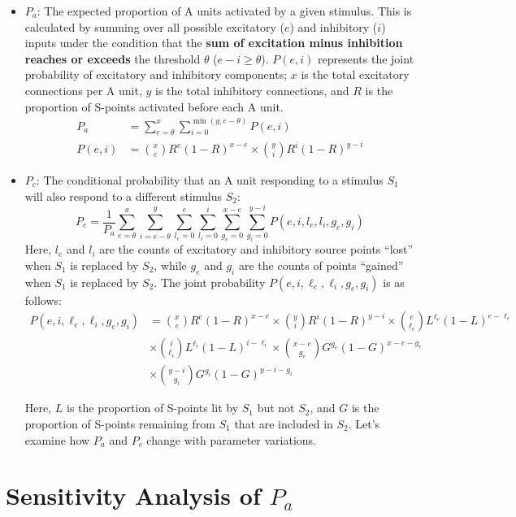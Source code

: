 \documentclass[11p,oneside]{book}
\begin{document}
\begin{itemize}
    \item \textbf{$P_a$}: The expected proportion of A units activated by a given stimulus. This is calculated by summing over all possible excitatory ($e$) and inhibitory ($i$) inputs under the condition that the \textbf{sum of excitation minus inhibition reaches or exceeds} the threshold $\theta$ ($e - i \geq \theta$). $P(e, i)$ represents the joint probability of excitatory and inhibitory components; $x$ is the total excitatory connections per A unit, $y$ is the total inhibitory connections, and $R$ is the proportion of S-points activated before each A unit.
    \begin{align*}
    P_a &= \sum_{e=\theta}^x \sum_{i=0}^{\min(y, e-\theta)} P(e, i) \\
    P(e, i) &= \binom{x}{e} R^e (1 - R)^{x - e} \times \binom{y}{i} R^i (1 - R)^{y - i}
\end{align*}
    \item \textbf{$P_c$}: The conditional probability that an A unit responding to a stimulus $S_1$ will also respond to a different stimulus $S_2$:
    \[
    P_c = \frac{1}{P_a} \sum_{e=\theta}^x \sum_{i=e-\theta}^y \sum_{l_e=0}^e \sum_{l_i=0}^i \sum_{g_e=0}^{x-e} \sum_{g_i=0}^{y-i} P(e, i, l_e, l_i, g_e, g_i)
    \]
    Here, $l_e$ and $l_i$ are the counts of excitatory and inhibitory source points “lost” when $S_1$ is replaced by $S_2$, while $g_e$ and $g_i$ are the counts of points “gained” when $S_1$ is replaced by $S_2$. The joint probability $P(e, i, \ell_e, \ell_i, g_e, g_i)$ is as follows:
\begin{align*}
        P(e, i, \ell_e, \ell_i, g_e, g_i) &= \binom{x}{e} R^e (1 - R)^{x - e} \times \binom{y}{i} R^i (1 - R)^{y - i} \times \binom{e}{\ell_e} L^{\ell_e} (1 - L)^{e - \ell_e} \\
        &\times \binom{i}{\ell_i} L^{\ell_i} (1 - L)^{i - \ell_i} \times \binom{x - e}{g_e} G^{g_e} (1 - G)^{x - e - g_e} \\
        & \times \binom{y - i}{g_i} G^{g_i} (1 - G)^{y - i - g_i}
\end{align*}
  
    Here, $L$ is the proportion of S-points lit by $S_1$ but not $S_2$, and $G$ is the proportion of S-points remaining from $S_1$ that are included in $S_2$. Let’s examine how $P_a$ and $P_c$ change with parameter variations.
\end{itemize}

\section*{Sensitivity Analysis of $P_a$}
\end{document}
